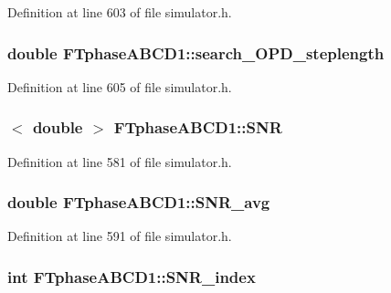 Definition at line 603 of file simulator.h.

\hypertarget{classFTphaseABCD1_aa132fe67440c634e536d10b268d23196}{
\subsubsection[{search\_\-OPD\_\-steplength}]{\setlength{\rightskip}{0pt plus 5cm}double {\bf FTphaseABCD1::search\_\-OPD\_\-steplength}}}
\label{classFTphaseABCD1_aa132fe67440c634e536d10b268d23196}


Definition at line 605 of file simulator.h.

\hypertarget{classFTphaseABCD1_ad3964d7a7eef88f1cffd5441c6de2c91}{
\subsubsection[{SNR}]{$<$ double $>$ {\bf FTphaseABCD1::SNR}}}
\label{classFTphaseABCD1_ad3964d7a7eef88f1cffd5441c6de2c91}


Definition at line 581 of file simulator.h.

\hypertarget{classFTphaseABCD1_a49c0cfb57d7091c4d27ed81c5a667658}{
\subsubsection[{SNR\_\-avg}]{\setlength{\rightskip}{0pt plus 5cm}double {\bf FTphaseABCD1::SNR\_\-avg}}}
\label{classFTphaseABCD1_a49c0cfb57d7091c4d27ed81c5a667658}


Definition at line 591 of file simulator.h.

\hypertarget{classFTphaseABCD1_a6b80d377fe91a74243fe7145a6d76a62}{
\subsubsection[{SNR\_\-index}]{\setlength{\rightskip}{0pt plus 5cm}int {\bf FTphaseABCD1::SNR\_\-index}}}
\label{classFTphaseABCD1_a6b80d377fe91a74243fe7145a6d76a62}


